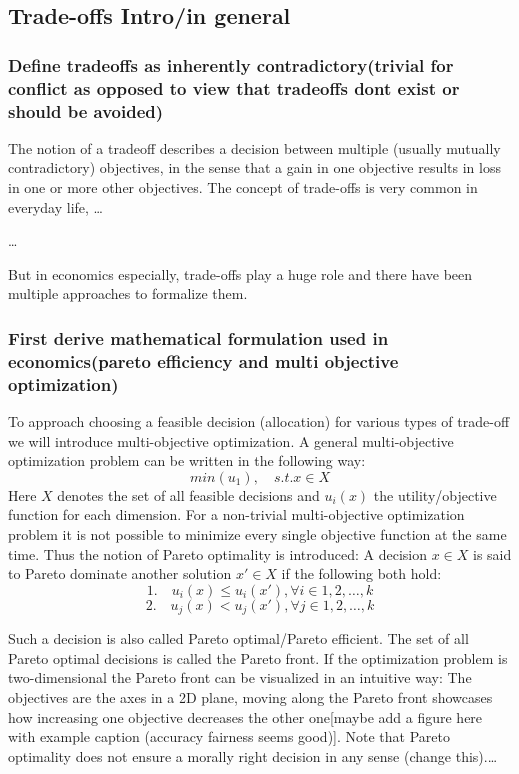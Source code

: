 \subsection{Trade-offs Intro/in general}
	\subsubsection{Define tradeoffs as  inherently contradictory(trivial for conflict as opposed to view that tradeoffs dont exist or should be avoided)}


	The notion of a tradeoff describes a decision between multiple (usually mutually contradictory) objectives, in the sense that a gain in one objective results in loss in one or more other objectives.
	The concept of trade-offs is very common in everyday life, \dots

	\dots
	
	But in economics especially, trade-offs play a huge role and there have been multiple approaches to formalize them.

	\subsubsection{First derive mathematical formulation used in economics(pareto efficiency and multi objective optimization)}

	To approach choosing a feasible decision (allocation) for various types of trade-off we will introduce multi-objective optimization.
	A general multi-objective optimization problem can be written in the following way:
	$$min(u_1), \quad s.t. x\in X$$
	Here $X$ denotes the set of all feasible decisions and $u_i(x)$ the utility/objective function for each dimension.
	For a non-trivial multi-objective optimization problem it is not possible to minimize every single objective function at the same time.
	Thus the notion of Pareto optimality is introduced:
	A decision $x\in X$ is said to Pareto dominate another solution $x'\in X$ if the following both hold:
	$$1.\quad u_i(x)\le u_i(x'), \forall i\in {1,2,\dots,k}$$
	$$2. \quad u_j(x) < u_j(x'), \forall j\in {1,2,\dots,k}$$

	Such a decision is also called Pareto optimal/Pareto efficient.
	The set of all Pareto optimal decisions is called the Pareto front.
	If the optimization problem is two-dimensional the Pareto front can be visualized in an intuitive way:
	The objectives are the axes in a 2D plane, moving along the Pareto front showcases how increasing one objective decreases the other one[maybe add a figure here with example caption (accuracy fairness seems good)].
	Note that Pareto optimality does not ensure a morally right decision in any sense (change this).\dots

